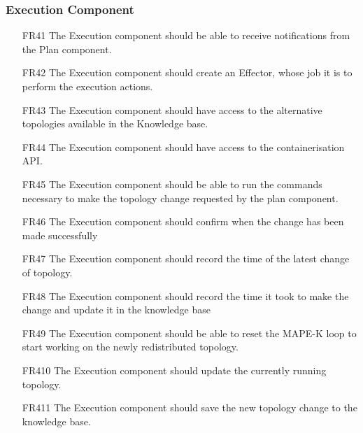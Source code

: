 \subsubsection{\textbf{Execution Component}}
\begin{itemize}
    \item [FR41] The Execution component should be able to receive notifications from the Plan component.
    \item [FR42] The Execution component should create an Effector, whose job it is to perform the execution actions.
    \item [FR43] The Execution component should have access to the alternative topologies available in the Knowledge base.
    \item [FR44] The Execution component should have access to the containerisation API.
    \item [FR45] The Execution component should be able to run the commands necessary to make the topology change requested by the plan component.
    \item [FR46] The Execution component should confirm when the change has been made successfully
    \item [FR47]The Execution component should record the time of the latest change of topology.
    \item [FR48] The Execution component should record the time it took to make the change and update it in the knowledge base
    \item [FR49] The Execution component should be able to reset the MAPE-K loop to start working on the newly redistributed topology.
    \item [FR410] The Execution component should update the currently running topology.
    \item [FR411] The Execution component should save the new topology change to the knowledge base.
\end{itemize}

